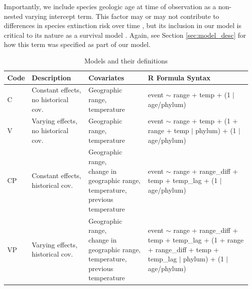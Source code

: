 \documentclass[12pt,letterpaper]{article}
\begin{document}
\begin{refsection}
Importantly, we include species geologic age at time of observation as a non-nested varying intercept term. This factor may or may not contribute to differences in species extinction risk over time \citep{Smits2015,Finnegan2008,Ezard2012,VanValen1973,Liow2011,Crampton2016}, but its inclusion in our model is critical to its nature as a survival model \cite{Tutz2016}. Again, see Section \ref{sec:model_desc} for how this term was specified as part of our model.

\begin{table}[ht]
  \caption{Models and their definitions}
  \begin{threeparttable}
    {
      \def\arraystretch{1.5}
      \begin{tabular}{ l p{3cm} l l }
        Code & Description & Covariates & R Formula Syntax\tnote{a}\phantom{\textsuperscript{a}} \\
        \hline
        C & Constant effects, no historical cov. & \parbox[t]{0.25\textwidth}{Geographic range,\\temperature} & \parbox[t]{0.33\textwidth}{event $\sim$ range + temp +\\(1 $|$ age/phylum)} \\
        V & Varying effects, no historical cov. & \parbox[t]{0.25\textwidth}{Geographic range,\\temperature} & \parbox[t]{0.33\textwidth}{event $\sim$ range + temp +\\(1 + range + temp $|$ phylum) + (1 $|$ age/phylum)} \\ 
        CP & Constant effects, historical cov. & \parbox[t]{0.25\textwidth}{Geographic range,\\change in geographic range, temperature,\\previous temperature} & \parbox[t]{0.33\textwidth}{event $\sim$ range + range\_diff +\\temp + temp\_lag +\\(1 $|$ age/phylum)} \\
        VP & Varying effects, historical cov. & \parbox[t]{0.25\textwidth}{Geographic range,\\change in geographic range, temperature,\\previous temperature} & \parbox[t]{0.33\textwidth}{event $\sim$ range + range\_diff +\\temp + temp\_lag +\\(1 + range + range\_diff +\\temp + temp\_lag $|$ phylum) +\\(1 $|$ age/phylum)} \\

\end{tabular}}
\end{threeparttable}
\end{table}
\end{refsection}
\end{document}
